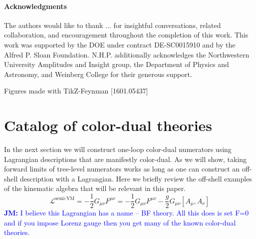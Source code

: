 \documentclass[11pt,letter]{article}
\newcommand{\jm}[1]{\textcolor{blue}{\textbf{JM: }{#1}}}
\def\be{\begin{equation}}
\def\ee{\end{equation}}
\begin{document}
\paragraph{Acknowledgments} The authors would like to thank ... for insightful conversations, related collaboration, and encouragement throughout the completion of this work. This work was supported by the DOE under contract DE-SC0015910 and by the Alfred P. Sloan Foundation. N.H.P. additionally acknowledges the Northwestern University Amplitudes and Insight group, the Department of Physics and Astronomy, and Weinberg College for their generous support. 

Figures made with TikZ-Feynman [1601.05437]

\appendix
\section{Catalog of color-dual theories}
\label{sec:CKLagrangians}
In the next section we will construct one-loop color-dual numerators using Lagrangian descriptions that are manifestly color-dual. As we will show, taking forward limits of tree-level numerators works as long as one can construct an off-shell description with a Lagrangian. Here we briefly review the off-shell examples of the kinematic algebra that will be relevant in this paper. 
\be
\mathcal{L}^{\text{semi-YM}} = - \frac{1}{2} G_{\mu\nu} F^{\mu\nu} = - \frac{1}{2} G_{\mu\nu} F^{\mu\nu} - \frac{g}{2} G_{\mu\nu} [A_\mu, A_\nu]
\ee
\jm{I believe this Lagrangian has a name -- BF theory.  All this does is set F=0 and if you impose Lorenz gauge then you get many of the known color-dual theories.}
\end{document}
